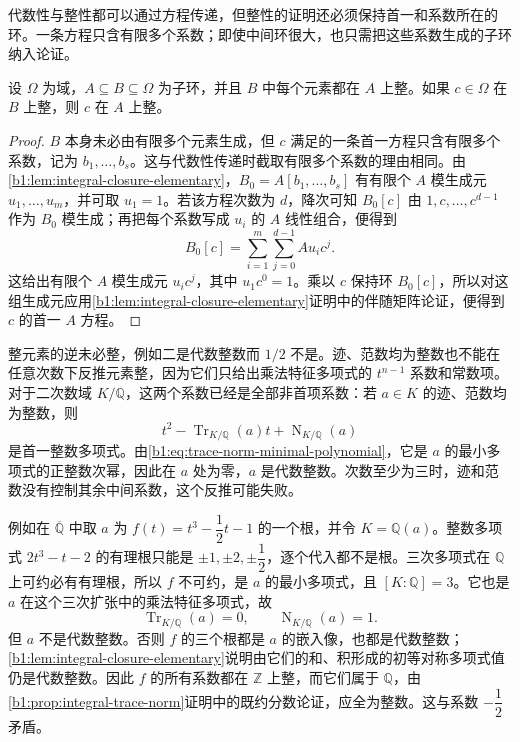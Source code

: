 代数性与整性都可以通过方程传递，但整性的证明还必须保持首一和系数所在的环。一条方程只含有限多个系数；即使中间环很大，也只需把这些系数生成的子环纳入论证。

\begin{proposition}\label{b1:prop:integrality-transitive-elementary}
	设 \(\Omega\) 为域，\(A\subseteq B\subseteq\Omega\) 为子环，并且 \(B\) 中每个元素都在 \(A\) 上整。如果 \(c\in\Omega\) 在 \(B\) 上整，则 \(c\) 在 \(A\) 上整。
\end{proposition}
\begin{proof}
	\(B\) 本身未必由有限多个元素生成，但 \(c\) 满足的一条首一方程只含有限多个系数，记为 \(b_1,\ldots,b_s\)。这与代数性传递时截取有限多个系数的理由相同。由\cref{b1:lem:integral-closure-elementary}，\(B_0=A[b_1,\ldots,b_s]\) 有有限个 \(A\) 模生成元 \(u_1,\ldots,u_m\)，并可取 \(u_1=1\)。若该方程次数为 \(d\)，降次可知 \(B_0[c]\) 由 \(1,c,\ldots,c^{d-1}\) 作为 \(B_0\) 模生成；再把每个系数写成 \(u_i\) 的 \(A\) 线性组合，便得到
	\[
		B_0[c]=\sum_{i=1}^m\sum_{j=0}^{d-1}A u_i c^j.
	\]
	这给出有限个 \(A\) 模生成元 \(u_i c^j\)，其中 \(u_1c^0=1\)。乘以 \(c\) 保持环 \(B_0[c]\)，所以对这组生成元应用\cref{b1:lem:integral-closure-elementary}证明中的伴随矩阵论证，便得到 \(c\) 的首一 \(A\) 方程。
\end{proof}
整元素的逆未必整，例如二是代数整数而 \(1/2\) 不是。迹、范数均为整数也不能在任意次数下反推元素整，因为它们只给出乘法特征多项式的 \(t^{n-1}\) 系数和常数项。对于二次数域 \(K/\mathbb Q\)，这两个系数已经是全部非首项系数：若 \(a\in K\) 的迹、范数均为整数，则
\[
	t^2-\operatorname{Tr}_{K/\mathbb Q}(a)t+\operatorname{N}_{K/\mathbb Q}(a)
\]
是首一整数多项式。由\eqref{b1:eq:trace-norm-minimal-polynomial}，它是 \(a\) 的最小多项式的正整数次幂，因此在 \(a\) 处为零，\(a\) 是代数整数。次数至少为三时，迹和范数没有控制其余中间系数，这个反推可能失败。

\ProseParagraphBreak
例如在 \(\overline{\mathbb Q}\) 中取 \(a\) 为 \(f(t)=t^3-\dfrac12t-1\) 的一个根，并令 \(K=\mathbb Q(a)\)。整数多项式 \(2t^3-t-2\) 的有理根只能是 \(\pm1,\pm2,\pm\dfrac12\)，逐个代入都不是根。三次多项式在 \(\mathbb Q\) 上可约必有有理根，所以 \(f\) 不可约，是 \(a\) 的最小多项式，且 \([K:\mathbb Q]=3\)。它也是 \(a\) 在这个三次扩张中的乘法特征多项式，故
\[
	\operatorname{Tr}_{K/\mathbb Q}(a)=0, \qquad \operatorname{N}_{K/\mathbb Q}(a)=1.
\]
但 \(a\) 不是代数整数。否则 \(f\) 的三个根都是 \(a\) 的嵌入像，也都是代数整数；\cref{b1:lem:integral-closure-elementary}说明由它们的和、积形成的初等对称多项式值仍是代数整数。因此 \(f\) 的所有系数都在 \(\mathbb Z\) 上整，而它们属于 \(\mathbb Q\)，由\cref{b1:prop:integral-trace-norm}证明中的既约分数论证，应全为整数。这与系数 \(-\dfrac12\) 矛盾。
